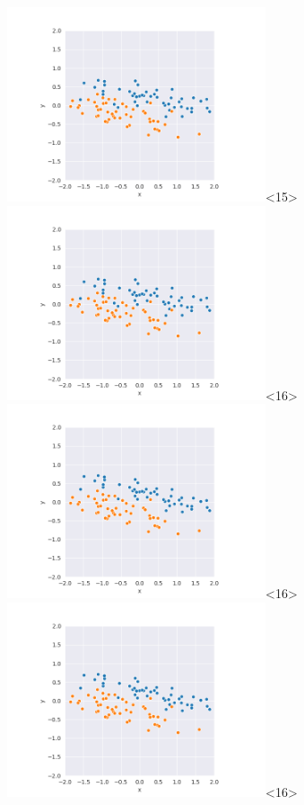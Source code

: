 \begin{frame}
  \includegraphics[width=3in]{../png/ward_stretch/ward_stretch_71.png}<15>
  \includegraphics[width=3in]{../png/ward_stretch/ward_stretch_76.png}<16>
  \includegraphics[width=3in]{../png/ward_stretch/ward_stretch_81.png}<16>
  \includegraphics[width=3in]{../png/ward_stretch/ward_stretch_86.png}<16>
  

\end{frame}
